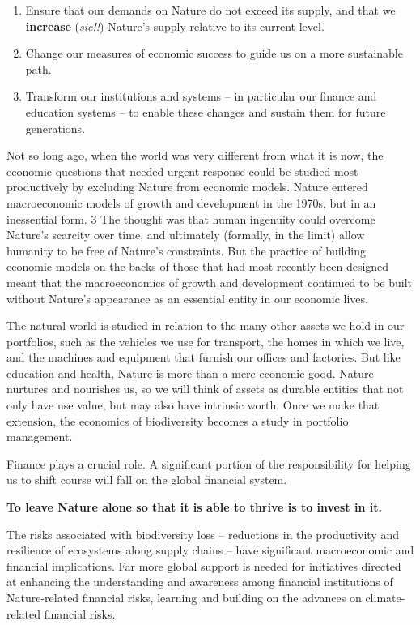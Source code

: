 \documentclass[
]{book}
\begin{document}
\begin{enumerate}
\def\labelenumi{(\roman{enumi})}
\item
  Ensure that our demands on Nature do not exceed its supply,
  and that we \textbf{increase} (\emph{sic!!}) Nature's supply relative to its current level.
\item
  Change our measures of economic success to guide us on a
  more sustainable path.
\item
  Transform our institutions and systems -- in particular our
  finance and education systems -- to enable these changes and
  sustain them for future generations.
\end{enumerate}

Not so long ago, when the
world was very different from what it is now, the economic questions that needed urgent
response could be studied most productively by excluding Nature from economic models.
Nature entered macroeconomic models of growth and development in the 1970s, but in an
inessential form. 3 The thought was that human ingenuity could overcome Nature's scarcity over
time, and ultimately (formally, in the limit) allow humanity to be free of Nature's constraints.
But the practice of building economic models on the backs of those that had most recently been
designed meant that the macroeconomics of growth and development continued to be built
without Nature's appearance as an essential entity in our economic lives.

The natural world is studied in relation to the many other assets we
hold in our portfolios, such as the vehicles we use for transport, the homes in which we live,
and the machines and equipment that furnish our offices and factories. But like education and
health, Nature is more than a mere economic good. Nature nurtures and nourishes us, so we
will think of assets as durable entities that not only have use value, but may also have intrinsic
worth. Once we make that extension, the economics of biodiversity becomes a study in portfolio
management.

Finance plays a crucial role. A significant portion of the responsibility for helping us to shift
course will fall on the global financial system.

\textbf{To leave Nature alone so that it is able to thrive is to invest in it.}

The risks associated with biodiversity loss -- reductions in the productivity and resilience of
ecosystems along supply chains -- have significant macroeconomic and financial implications.
Far more global support is needed for initiatives directed at enhancing the understanding and
awareness among financial institutions of Nature-related financial risks, learning and building
on the advances on climate-related financial risks.
\end{document}
